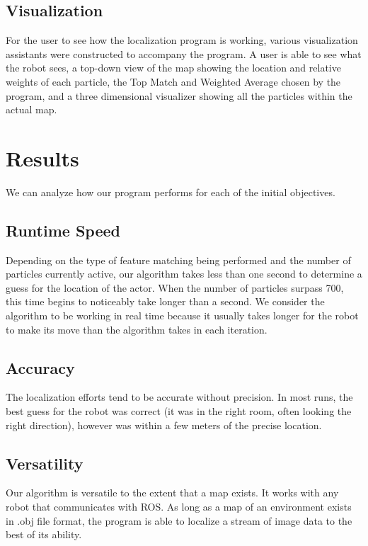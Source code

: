 \documentclass[a4paper,11pt]{article}
\begin{document}
\subsection{Visualization}
For the user to see how the localization program is working, various visualization assistants were constructed to accompany the program. A user is able to see what the robot sees, a top-down view of the map showing the location and relative weights of each particle, the Top Match and Weighted Average chosen by the program, and a three dimensional visualizer showing all the particles within the actual map.












\section{Results}
We can analyze how our program performs for each of the initial objectives.

\subsection{Runtime Speed}
Depending on the type of feature matching being performed and the number of particles currently active, our algorithm takes less than one second to determine a guess for the location of the actor. When the number of particles surpass 700, this time begins to noticeably take longer than a second. We consider the algorithm to be working in real time because it usually takes longer for the robot to make its move than the algorithm takes in each iteration.

\subsection{Accuracy}
The localization efforts tend to be accurate without precision. In most runs, the best guess for the robot was correct (it was in the right room, often looking the right direction), however was within a few meters of the precise location. 


\subsection{Versatility}
Our algorithm is versatile to the extent that a map exists. It works with any robot that communicates with ROS. As long as a map of an environment exists in .obj file format, the program is able to localize a stream of image data to the best of its ability.
\end{document}

